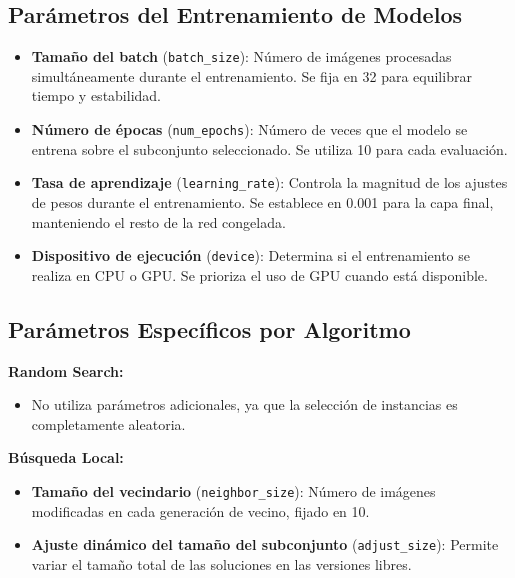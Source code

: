 \subsection{Parámetros del Entrenamiento de Modelos}\label{subsec:parametros-entrenamiento-modelos}

\begin{itemize}
    \item \textbf{Tamaño del batch} (\texttt{batch\_size}): Número de imágenes procesadas simultáneamente durante el entrenamiento.
          Se fija en 32 para equilibrar tiempo y estabilidad.
    \item \textbf{Número de épocas} (\texttt{num\_epochs}): Número de veces que el modelo se entrena sobre el subconjunto seleccionado.
          Se utiliza 10 para cada evaluación.
    \item \textbf{Tasa de aprendizaje} (\texttt{learning\_rate}): Controla la magnitud de los ajustes de pesos durante el entrenamiento.
          Se establece en 0.001 para la capa final, manteniendo el resto de la red congelada.
    \item \textbf{Dispositivo de ejecución} (\texttt{device}): Determina si el entrenamiento se realiza en CPU o GPU.
          Se prioriza el uso de GPU cuando está disponible.
\end{itemize}

\subsection{Parámetros Específicos por Algoritmo}\label{subsec:parametros-especificos-algoritmos}

\textbf{Random Search:}
\begin{itemize}
    \item No utiliza parámetros adicionales, ya que la selección de instancias es completamente aleatoria.
\end{itemize}

\textbf{Búsqueda Local:}
\begin{itemize}
    \item \textbf{Tamaño del vecindario} (\texttt{neighbor\_size}): Número de imágenes modificadas en cada generación de vecino, fijado en 10.
    \item \textbf{Ajuste dinámico del tamaño del subconjunto} (\texttt{adjust\_size}): Permite variar el tamaño total de las soluciones en las versiones libres.
\end{itemize}

